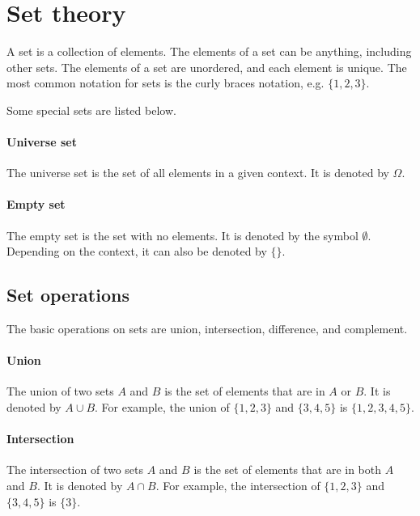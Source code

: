 
\section{Set theory}

A set is a collection of elements.  The elements of a set can be anything, including
other sets.  The elements of a set are unordered, and each element is unique.  The
most common notation for sets is the curly braces notation, e.g. $\{1, 2, 3\}$.

Some special sets are listed below.

\paragraph{Universe set}  The universe set is the set of all elements in a given context.
It is denoted by $\Omega$.

\paragraph{Empty set}  The empty set is the set with no elements.  It is denoted by
the symbol $\emptyset$.  Depending on the context, it can also be denoted by $\{\}$.

\subsection{Set operations}

The basic operations on sets are union, intersection, difference, and complement.

\paragraph{Union}  The union of two sets $A$ and $B$ is the set of elements that are in
$A$ or $B$.  It is denoted by $A \cup B$.  For example, the union of $\{1, 2, 3\}$ and
$\{3, 4, 5\}$ is $\{1, 2, 3, 4, 5\}$.

\paragraph{Intersection}  The intersection of two sets $A$ and $B$ is the set of elements
that are in both $A$ and $B$.  It is denoted by $A \cap B$.  For example, the intersection
of $\{1, 2, 3\}$ and $\{3, 4, 5\}$ is $\{3\}$.


